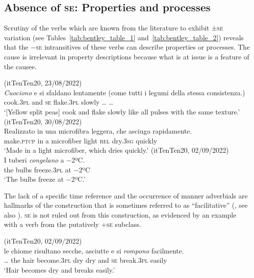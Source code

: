 \documentclass[output=paper,colorlinks,citecolor=brown
]{langscibook}
\begin{document}
\subsection{Absence of \textsc{se}: Properties and processes}
\label{bentley_section_4.1}
Scrutiny of the verbs which are known from the literature to exhibit ±\textsc{se} variation (see Tables~\ref{tab:bentley_table_1} and~\ref{tab:bentley_table_2}) reveals that the −\textsc{se} intransitives of these verbs can describe properties or processes. The cause is irrelevant in property descriptions because what is at issue is a feature of the causee. 

\ea(itTenTen20, 23/08/2022) \label{bentley_example_20}\\
    \gll \textit{Cuociono} e			si		sfaldano		lentamente {(come tutti i legumi della stessa} consistenza.)    \\
    cook.3\textsc{pl}		and	\textsc{se}		flake.3\textsc{pl}		slowly {\ldots} {\ldots}\\
    \glt ‘[Yellow split peas] cook and flake slowly like all pulses with the same texture.’
\ex \label{bentley_example_21}(itTenTen20, 30/08/2022)\\
    \gll Realizzato	in una microfibra		leggera,	che			asciuga		rapidamente. \\
    make.\textsc{ptcp}	in	a				microfiber		light				\textsc{rel}		dry.3\textsc{sg}		quickly \\
    \glt ‘Made in a light microfiber, which dries quickly.’
\ex \label{bentley_example_22}(itTenTen20, 02/09/2022)\\
    \gll I tuberi \textit{congelano} a −2ºC.\\
    	the		bulbs		freeze.3\textsc{pl}		at		−2ºC \\
    \glt ‘The bulbs freeze at −2ºC.’
\z


The lack of a specific time reference and the occurrence of manner adverbials are hallmarks of the construction that is sometimes referred to as “facilitative” (\citealt[147--149]{kemmer1993middle}, see also \cite[25--26]{levin1993english}). \textsc{se} is not ruled out from this construction, as evidenced by an example with a verb from the putatively +\textsc{se} subclass.


\ea \label{bentley_example_23}(itTenTen20, 02/09/2022)\\
    \gll  {\ldots}  le		chiome risultano				secche,	asciutte e				si 		\textit{rompono} facilmente.\\
    {\ldots} the	hair				become.3\textsc{pl}	dry					dry					and	\textsc{se}		break.3\textsc{pl}	easily \\
    \glt ‘Hair becomes dry and breaks easily.’ 
\z
\end{document}
